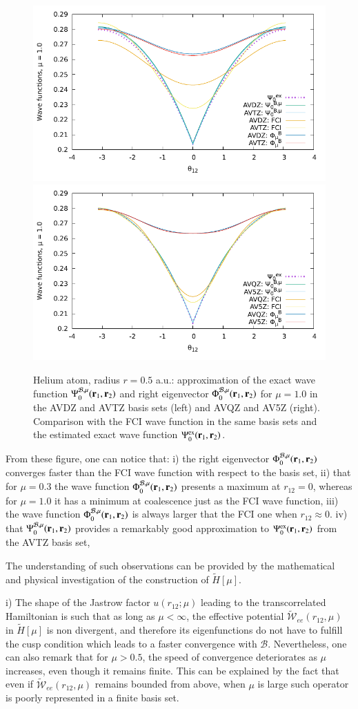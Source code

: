 \documentclass[aip,jcp,reprint,noshowkeys,superscriptaddress]{revtex4-1}
\newcommand{\br}[0]{{\bf {r}}}
\newcommand{\psiex}[0]{\Psi^{\text{ex}}_0}
\newcommand{\phimub}[0]{\Phi^{\mathcal{B},\mu}_0}
\newcommand{\psimub}[0]{\Psi^{\mathcal{B},\mu}_0}
\newcommand{\basis}[0]{\mathcal{B}}
\begin{document}
\begin{figure}
 \label{fig:mu_1.0_dz_3}
        \includegraphics[width=0.45\linewidth]{plots/He/cusp/He_mu_1_0_cusp_avdz_avtz_3.pdf}
        \includegraphics[width=0.45\linewidth]{plots/He/cusp/He_mu_1_0_cusp_avqz_av5z_3.pdf}\\
        \caption{
        Helium atom, radius $r=0.5$ a.u.: approximation of the exact wave function $\psimub(\br{}_1,\br{}_2)$ and right eigenvector $\phimub(\br{}_1,\br{}_2)$ for $\mu=1.0$ in the AVDZ and AVTZ basis sets (left) and AVQZ and AV5Z (right). Comparison with the FCI wave function in the same basis sets and the estimated exact wave function $\psiex(\br{}_1,\br{}_2)$.  }
\end{figure}


From these figure, one can notice that: 
i) the right eigenvector $\phimub(\br{}_1,\br{}_2)$ converges faster than the FCI wave function with respect to the basis set, 
ii) that for $\mu=0.3$ the wave function $\phimub(\br{}_1,\br{}_2)$ presents a maximum at $r_{12}=0$, whereas for $\mu=1.0$ it has a minimum at coalescence just as the FCI wave function, 
iii) the wave function $\phimub(\br{}_1,\br{}_2)$ is always larger that the FCI one when $r_{12}\approx 0$. 
iv) that $\psimub(\br{}_1,\br{}_2)$ provides a remarkably good approximation to $\psiex(\br{}_1,\br{}_2)$ from the AVTZ basis set, 

The understanding of such observations can be provided by the mathematical and physical investigation of the construction of $\tilde{H}[\mu]$. 

i) The shape of the Jastrow factor $u(r_{12};\mu)$ leading to the transcorrelated Hamiltonian is such that as long as $\mu < \infty$, the effective potential $\tilde{\mathcal{W}}_{ee}(r_{12},\mu)$ in $\tilde{H}[\mu]$ is non divergent, and therefore its eigenfunctions do not have to fulfill the cusp condition which leads to a faster convergence with $\basis$. 
Nevertheless, one can also remark that for $\mu > 0.5$, the speed of convergence deteriorates as $\mu$ increases, even though it remains finite. This can be explained by the fact that even if $\tilde{\mathcal{W}}_{ee}(r_{12},\mu)$ remains bounded from above, when $\mu$ is large such operator is poorly represented in a finite basis set. 
\end{document}
